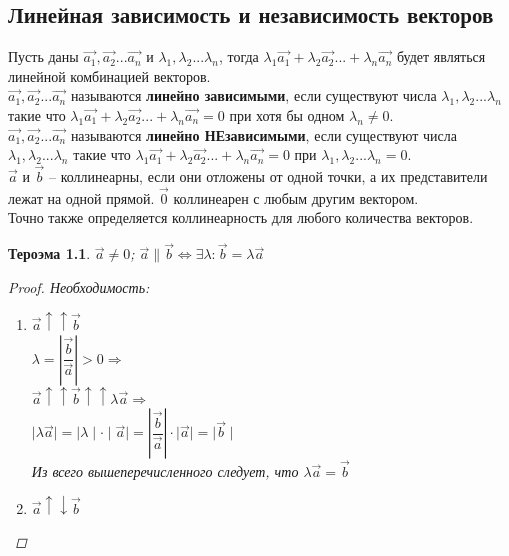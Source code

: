 \documentclass[oneside]{book}
\newtheorem{thm}{Тероэма}[chapter] %
\begin{document}
\begin{itemize}
\begin{enumerate}
\setcounter{chapter}{40}
\chapter{Линейная зависимость и независимость векторов}
Пусть даны $\vec{a_{1}},\vec{a_{2}}...\vec{a_{n}}$ и $\lambda_{1},\lambda_{2}...\lambda_{n}$, тогда $\lambda_{1}\vec{a_{1}}+\lambda_{2}\vec{a_{2}}...+\lambda_{n}\vec{a_{n}}$ будет являться линейной комбинацией векторов.\\
$\vec{a_{1}},\vec{a_{2}}...\vec{a_{n}}$ называются \textbf{линейно зависимыми}, если существуют числа $\lambda_{1},\lambda_{2}...\lambda_{n}$ такие что $\lambda_{1}\vec{a_{1}}+\lambda_{2}\vec{a_{2}}...+\lambda_{n}\vec{a_{n}}=0$ при хотя бы одном $\lambda_{n}\ne 0$.\\
$\vec{a_{1}},\vec{a_{2}}...\vec{a_{n}}$ называются \textbf{линейно НЕзависимыми}, если существуют числа $\lambda_{1},\lambda_{2}...\lambda_{n}$ такие что $\lambda_{1}\vec{a_{1}}+\lambda_{2}\vec{a_{2}}...+\lambda_{n}\vec{a_{n}}=0$ при $\lambda_{1},\lambda_{2}...\lambda_{n}=0$.\\
$\vec{a}$ и $\vec{b}$ -- коллинеарны, если они отложены от одной точки, а их представители лежат на одной прямой. $\vec{0}$ коллинеарен с любым другим вектором.\\
Точно также определяется коллинеарность для любого количества векторов.\\
\begin{thm}
    $\vec{a}\ne 0$; $\vec{a}\parallel \vec{b} \Leftrightarrow \exists \lambda: \vec{b} = \lambda \vec{a}$
    \begin{proof} 
      \par Необходимость: 
      \begin{enumerate}
        \item $\vec{a} \uparrow \uparrow \vec{b}$\\
        $\lambda = \left| \dfrac{\vec{b}}{\vec{a}}\right|>0 \Longrightarrow $\\
        $\vec{a} \uparrow \uparrow \vec{b} \uparrow \uparrow \lambda\vec{a} \Longrightarrow$\\
        $\mid \lambda\vec{a} \mid = \mid \lambda \mid \cdot \mid \vec{a} \mid = 
        \left| \dfrac{\vec{b}}{\vec{a}}\right| \cdot \mid \vec{a} \mid = \mid \vec{b} \mid$\\
        Из всего вышеперечисленного следует, что $\lambda\vec{a}=\vec{b}$
        \item $\vec{a} \uparrow \downarrow \vec{b}$\\

\end{enumerate}
\end{proof}
\end{thm}
\end{enumerate}
\end{itemize}
\end{document}

